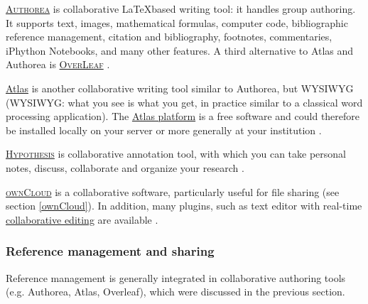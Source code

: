 \label{angrpatd}

\noindent {} \textsc{\href{https://www.authorea.com/}{Authorea}} is collaborative \LaTeX based writing tool: it handles group authoring. It supports text, images, mathematical formulas, computer code, bibliographic reference management, citation and bibliography, footnotes, commentaries, iPhython Notebooks, and many other features.   A third alternative to Atlas and Authorea is \textsc{\href{https://www.overleaf.com/}{OverLeaf}} \cite{authorea_authorea:_2015,oreilley_getting-started--atlas_2015}.

\vspace{0.4cm}

\noindent {} \href{http://atlas.oreiley.com}{Atlas} is another collaborative writing tool similar to Authorea, but WYSIWYG (WYSIWYG: what you see is what you get, in practice similar to a classical word processing application). The \href{https://github.com/oreillymedia/Getting-Started-with-Atlas}{Atlas platform} is a free software and could therefore be installed locally on your server or more generally at your institution \cite{oreilly_atlas_2015,authorea_authorea:_2015,oreilley_getting-started--atlas_2015}.

\vspace{0.4cm}

\noindent {} \textsc{\href{https://hypothes.is}{Hypothesis}} is collaborative annotation tool, with which you can take personal notes, discuss, collaborate and organize your research \cite{hypothes.is_hypothesis_2015}.

\vspace{0.4cm}

\noindent {} \textsc{\href{http://owncloud.org}{ownCloud}} is a collaborative software, particularly useful for file sharing (see section \ref{ownCloud}). In addition, many plugins, such as text editor with real-time \href{https://www.youtube.com/watch?v=xsqSLeppxm0}{collaborative editing} are available \cite{owncloud_owncloud.org_2015}. 

%
%

\subsubsection{Reference management and sharing}

Reference management is generally integrated in collaborative authoring tools (e.g. Authorea, Atlas, Overleaf), which were discussed in the previous section.

